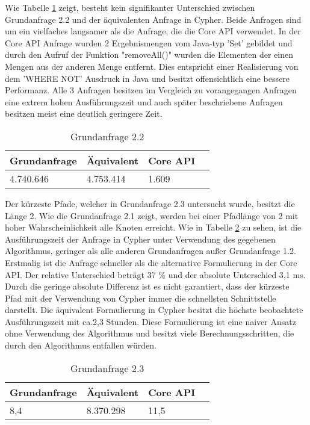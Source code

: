 \FloatBarrier
Wie Tabelle \ref{tab:Query2_2} zeigt, besteht kein  signifikanter Unterschied zwischen Grundanfrage 2.2 und der äquivalenten Anfrage in Cypher. Beide Anfragen sind um ein vielfaches langsamer als die Anfrage, die die Core API verwendet. In der Core API Anfrage wurden 2 Ergebnismengen vom Java-typ 'Set' gebildet und durch den Aufruf der Funktion "removeAll()"  wurden die Elementen der einen Mengen aus der anderen Menge entfernt. Dies entspricht einer Realisierung von dem 'WHERE NOT' Ausdruck  in Java und besitzt offensichtlich eine bessere Performanz. Alle 3 Anfragen besitzen im Vergleich zu vorangegangen Anfragen eine extrem hohen Ausführungszeit und auch später beschriebene Anfragen besitzen meist eine deutlich geringere Zeit.
\FloatBarrier
\begin{table}[h]
	\centering
		\begin{tabular}{ |p{3cm}|p{3cm}|p{3cm}|p{3cm}|  }
			\hline
			Grundanfrage & Äquivalent&Core API\\
			\hline
			4.740.646    & 4.753.414 &  1.609\\
			\hline
		\end{tabular}
		\caption{Grundanfrage 2.2}
		\label{tab:Query2_2}
\end{table}
\FloatBarrier
Der kürzeste Pfade, welcher in Grundanfrage 2.3 untersucht wurde, besitzt die Länge 2. Wie die Grundanfrage 2.1 zeigt, werden bei einer Pfadlänge von 2 mit hoher Wahrscheinlichkeit alle Knoten erreicht. Wie in Tabelle \ref{tab:Query2_3} zu sehen, ist die Ausführungszeit der Anfrage in Cypher unter Verwendung des gegebenen Algorithmus, geringer als alle anderen Grundanfragen außer Grundanfrage 1.2. Erstmalig ist die Anfrage schneller als die alternative Formulierung in der Core API. Der relative Unterschied beträgt 37 \% und  der absolute Unterschied 3,1 ms. Durch die geringe absolute Differenz ist es nicht garantiert, dass der kürzeste Pfad mit der Verwendung von Cypher immer die schnellsten Schnittstelle darstellt. \newline
Die äquivalent Formulierung in Cypher besitzt die höchste beobachtete Ausführungszeit mit ca.2,3 Stunden. Diese Formulierung ist eine naiver Ansatz ohne Verwendung des Algorithmus und besitzt viele Berechnungsschritten, die durch den Algorithmus entfallen würden.
\FloatBarrier
\begin{table}[!htb]
	\centering
		\begin{tabular}{ |p{3cm}|p{3cm}|p{3cm}|p{3cm}|  }
			\hline
			Grundanfrage & Äquivalent&Core API\\
			\hline
			8,4    & 8.370.298 &  11,5\\
			\hline
		\end{tabular}
		\caption{Grundanfrage 2.3}
		\label{tab:Query2_3}
\end{table}
